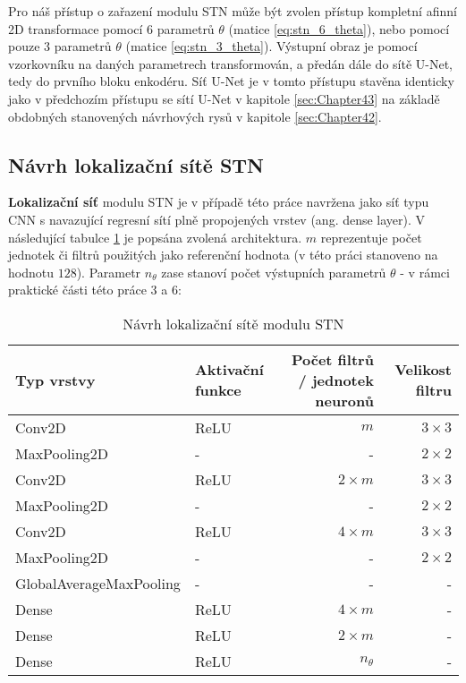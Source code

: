 Pro náš přístup o zařazení modulu STN může být zvolen přístup kompletní afinní 2D transformace pomocí 6 parametrů $\theta$ (matice \ref{eq:stn_6_theta}), nebo pomocí pouze 3 parametrů $\theta$ (matice \ref{eq:stn_3_theta}). Výstupní obraz je pomocí vzorkovníku na daných parametrech transformován, a předán dále do sítě U-Net, tedy do prvního bloku enkodéru. Síť U-Net je v tomto přístupu stavěna identicky jako v předchozím přístupu se sítí U-Net v kapitole \ref{sec:Chapter43} na základě obdobných stanovených návrhových rysů v kapitole \ref{sec:Chapter42}.

\subsection{Návrh lokalizační sítě STN}

\textbf{Lokalizační síť} modulu STN je v případě této práce navržena jako síť typu CNN s navazující regresní sítí plně propojených vrstev (ang. dense layer). V následující tabulce \ref{fig:stn_loc_net} je popsána zvolená architektura. $m$ reprezentuje počet jednotek či filtrů použitých jako referenční hodnota (v této práci stanoveno na hodnotu $128$). Parametr $n_{\theta}$ zase stanoví počet výstupních parametrů $\theta$ - v rámci praktické části této práce $3$ a $6$:

\begin{table}[H]
\centering
\begin{tabular}{@{}llrr@{}}
\toprule
Typ vrstvy & Aktivační funkce & Počet filtrů / jednotek neuronů & Velikost filtru \\ \midrule
Conv2D & ReLU & $m$ & $3 \times 3$ \\
MaxPooling2D & - & - & $2 \times 2$ \\
Conv2D & ReLU & $2\times m$ & $3 \times 3$ \\
MaxPooling2D & - & - & $2 \times 2$ \\
Conv2D & ReLU & $4\times m$ & $3 \times 3$ \\
MaxPooling2D & - & - & $2 \times 2$ \\
GlobalAverageMaxPooling & - & - & - \\
\bottomrule
Dense & ReLU & $4\times m$ & - \\
Dense & ReLU & $2\times m$ & - \\
Dense & ReLU & $n_{\theta}$ & - \\
\bottomrule
\end{tabular}
\caption[Návrh lokalizační sítě modulu STN] { Návrh lokalizační sítě modulu STN }
\label{fig:stn_loc_net}
\end{table}

